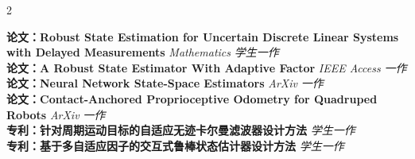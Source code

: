 \documentclass[10pt,A4]{article}
\begin{document}
\begin{paracol}{2}
\begin{rightcolumn}

\noindent
\normalsize\textbf{论文：Robust State Estimation for Uncertain Discrete Linear Systems with Delayed Measurements} 
\small \hfill \textit{Mathematics} \textit{学生一作} \\


\noindent
\normalsize\textbf{论文：A Robust State Estimator With Adaptive Factor} 
\small \hfill \textit{IEEE Access} \textit{一作} \\


\noindent
\normalsize\textbf{论文：Neural Network State-Space Estimators} 
\small \hfill \textit{ArXiv} \textit{一作} \\

\noindent
\normalsize\textbf{论文：Contact-Anchored Proprioceptive Odometry for Quadruped Robots} 
\small \hfill \textit{ArXiv} \textit{一作} \\

\noindent
\normalsize\textbf{专利：针对周期运动目标的自适应无迹卡尔曼滤波器设计方法} \small \hfill \textit{学生一作} \\


\noindent
\normalsize\textbf{专利：基于多自适应因子的交互式鲁棒状态估计器设计方法} \small \hfill \textit{学生一作} \\



\end{rightcolumn}
\end{paracol}
\end{document}
